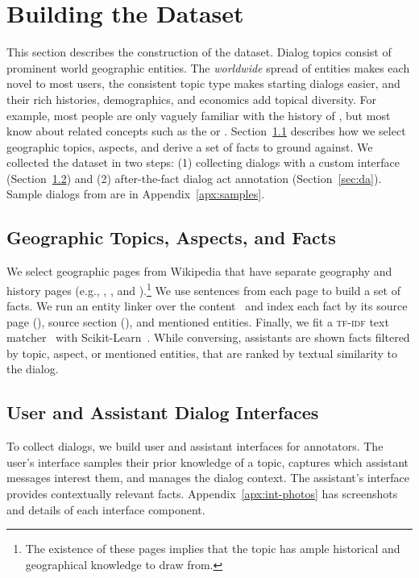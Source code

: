\section{Building the \rover{} Dataset}
\label{sec:data}

This section describes the construction of the \rover{} dataset.
Dialog topics consist of prominent world geographic entities.
The \emph{worldwide} spread of entities makes each novel to most users, the consistent topic type makes starting dialogs easier, and their rich histories, demographics, and economics add topical diversity.
For example, most people are only vaguely familiar with the history of , but most know about related concepts such as the  or .
Section~\ref{sec:geo} describes how we select geographic topics, aspects, and derive a set of facts to ground against.
We collected the dataset in two steps: (1) collecting dialogs with a custom interface (Section~\ref{sec:ints}) and (2) after-the-fact dialog act annotation (Section~\ref{sec:da}).
Sample dialogs from \rover{} are in Appendix~\ref{apx:samples}.

\subsection{Geographic Topics, Aspects, and Facts}
\label{sec:geo}
We select \ntopicsfull{} geographic pages from Wikipedia that have separate geography and history pages (e.g., , , and ).\footnote{
    The existence of these pages implies that the topic has ample historical and geographical knowledge to draw from.
}
We use sentences from each page to build a set of \nfactsfull{} facts.
We run an entity linker over the content~\citep{gupta-etal-2017-entity} and index each fact by its source page (), source section (), and mentioned entities.
Finally, we fit a \textsc{tf-idf} text matcher~\citep{rajaraman_ullman_2011} with Scikit-Learn~\citep{scikit-learn}.
While conversing, assistants are shown facts filtered by topic, aspect, or mentioned entities, that are ranked by textual similarity to the dialog.

\subsection{User and Assistant Dialog Interfaces}
\label{sec:ints}

To collect dialogs, we build user and assistant interfaces for annotators.
The user's interface samples their prior knowledge of a topic, captures which assistant messages interest them, and manages the dialog context.
The assistant's interface provides contextually relevant facts.
Appendix~\ref{apx:int-photos} has screenshots and details of each interface component.

